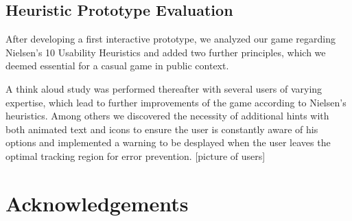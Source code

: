 \documentclass{chi-ext}
\begin{document}
\subsection{Heuristic Prototype Evaluation}
After developing a first interactive prototype, we  analyzed our game regarding Nielsen’s 10 Usability Heuristics \cite{nielsen1995usability} and added two further principles, which we deemed essential for a casual game in public context.
%

A think aloud study was performed thereafter with several users of varying expertise, which lead to further improvements of the game according to Nielsen's heuristics. Among others we discovered the necessity of additional hints with both animated text and icons to ensure the user is constantly aware of his options and implemented a warning to be desplayed when the user leaves the optimal tracking region for error prevention. [picture of users]


\section{Acknowledgements}
\end{document}
